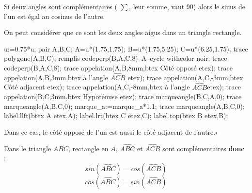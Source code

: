 \begin{propriete}
    Si deux angles sont complémentaires ( $\sum$, leur somme, vaut 90\degre ) alors le sinus de l'un est égal au cosinus de l'autre.
\end{propriete}

\begin{preuve}
    On peut considérer que ce sont les deux angles aigus dans un triangle rectangle.

    \medskip
    \begin{minipage}{0.4\linewidth}
        \begin{Geometrie}[CoinHD={(5u,4.5u)}]
            u:=0.75*u;            
            pair A,B,C;
            A=u*(1.75,1.75);
            B=u*(1.75,5.25);
            C=u*(6.25,1.75);
            trace polygone(A,B,C);
            remplis codeperp(B,A,C,8)--A--cycle withcolor noir;
            trace codeperp(B,A,C,8);
            trace appelation(A,B,8mm,btex Côté opposé etex);
            trace appelation(A,B,3mm,btex à l'angle $\widehat{ACB}$ etex);
            trace appelation(A,C,-3mm,btex Côté adjacent etex);
            trace appelation(A,C,-8mm,btex à l'angle $\widehat{ACB}$etex);
            trace appelation(B,C,3mm,btex Hypoténuse etex);            
            trace marqueangle(B,C,A,0);
            trace marqueangle(A,B,C,0);
            marque_a:=marque_a*1.1;    
            trace marqueangle(A,B,C,0);
            label.llft(btex A etex,A);
            label.lrt(btex C etex,C);
            label.top(btex B etex,B);
        \end{Geometrie}
    \end{minipage}
    \begin{minipage}{0.55\linewidth}
        Dans ce cas, le côté opposé de l'un est aussi le côté adjacent de l'autre.$\square$
    \end{minipage}
\end{preuve}

\begin{exemple*1}
    Dans le triangle $ABC$, rectangle en $A$, $\widehat{ABC}$ et $\widehat{ACB}$ sont complémentaires \textbf{donc} :    
    $$sin(\widehat{ABC})=cos(\widehat{ACB})$$
    $$cos(\widehat{ABC})=sin(\widehat{ACB})$$ 
\end{exemple*1}